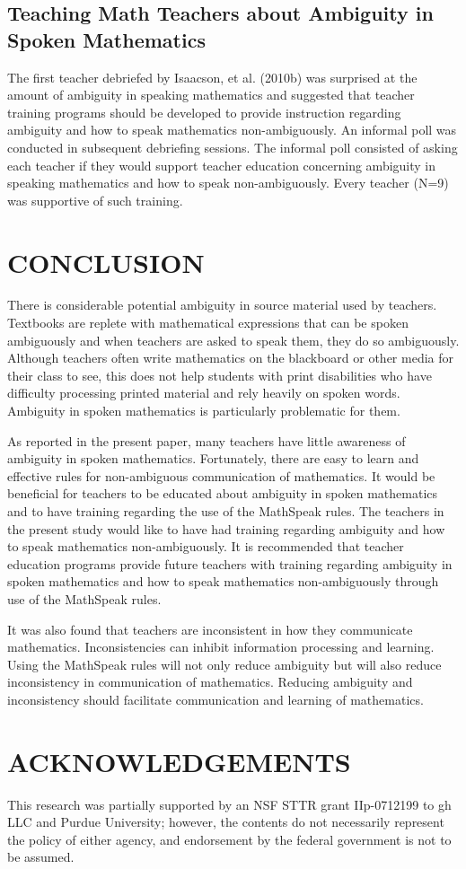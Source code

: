 \documentclass[11.5pt]{sig-alternate} %
\begin{document}
\begin{large}
\subsection*{Teaching Math Teachers about Ambiguity in Spoken Mathematics}
The first teacher debriefed by Isaacson, et al. (2010b) was surprised at the amount of ambiguity in speaking mathematics and suggested that teacher training programs should be developed to provide instruction regarding ambiguity and how to speak mathematics non-ambiguously. An informal poll was conducted in subsequent debriefing sessions. The informal poll consisted of asking each teacher if they would support teacher education concerning ambiguity in speaking mathematics and how to speak non-ambiguously. Every teacher (N=9) was supportive of such training. 

\section*{CONCLUSION}
There is considerable potential ambiguity in source material used by teachers. Textbooks are replete with mathematical expressions that can be spoken ambiguously and when teachers are asked to speak them, they do so ambiguously. Although teachers often write mathematics on the blackboard or other media for their class to see, this does not help students with print disabilities who have difficulty processing printed material and rely heavily on spoken words. Ambiguity in spoken mathematics is particularly problematic for them.

As reported in the present paper, many teachers have little awareness of ambiguity in spoken mathematics. Fortunately, there are easy to learn and effective rules for non-ambiguous communication of mathematics. It would be beneficial for teachers to be educated about ambiguity in spoken mathematics and to have training regarding the use of the MathSpeak rules. The teachers in the present study would like to have had training regarding ambiguity and how to speak mathematics non-ambiguously. It is recommended that teacher education programs provide future teachers with training regarding ambiguity in spoken mathematics and how to speak mathematics non-ambiguously through use of the MathSpeak rules.

It was also found that teachers are inconsistent in how they communicate mathematics. Inconsistencies can inhibit information processing and learning. Using the MathSpeak rules will not only reduce ambiguity but will also reduce inconsistency in communication of mathematics. Reducing ambiguity and inconsistency should facilitate communication and learning of mathematics.

\section*{ACKNOWLEDGEMENTS}
This research was partially supported by an NSF STTR grant IIp-0712199 to gh LLC and Purdue University; however, the contents do not necessarily represent the policy of either agency, and endorsement by the federal government is not to be assumed.

\end{large}
\clearpage
\end{document}

